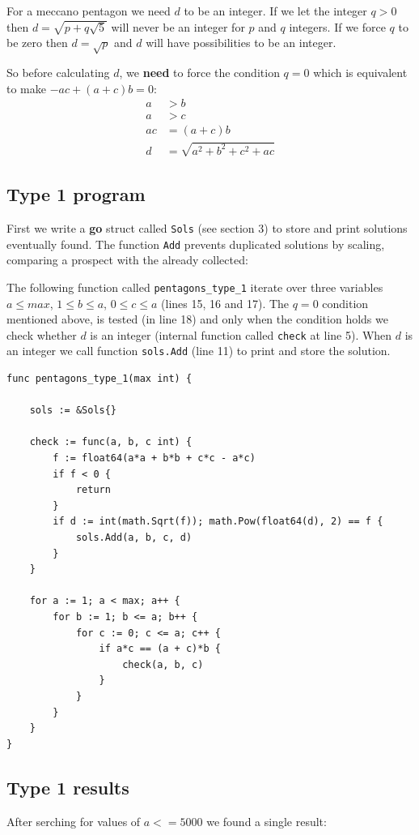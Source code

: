 \documentclass[11pt]{article}
\begin{document}
For a meccano pentagon we need $d$ to be an integer. If we let the integer $q > 0$ then $d = \sqrt{p + q\sqrt{5}}$ will never be an integer for $p$ and $q$ integers. If we force $q$ to be zero then $d = \sqrt{p}$ and $d$ will have possibilities to be an integer.

So before calculating $d$, we \textbf{need} to force the condition $q = 0$ which is 
equivalent to make $-ac + (a+c)b = 0$:
\begin{align*}
a  & > b\\
a  & > c\\
ac &= (a + c)b\\
 d &= \sqrt{a^2 + b^2 + c^2 + ac}
\end{align*}

\subsection{Type 1 program}

First we write a \textbf{go} struct called \texttt{Sols} (see section 3) to store and print solutions 
eventually found. The function \texttt{Add} prevents duplicated solutions by scaling,
comparing a prospect with the already collected:

The following function called \texttt{pentagons\_type\_1} iterate over three variables 
$a \leq max$, $1 \leq b \leq a$, $0 \leq c \leq a$ (lines 15, 16 and 17).
The $q = 0$ condition mentioned above, is tested (in line 18) and only when the condition holds
we check whether $d$ is an integer (internal function called \texttt{check} at line 5).
When $d$ is an integer we call function \texttt{sols.Add} (line 11) to print and store the 
solution.
\begin{lstlisting}
func pentagons_type_1(max int) {

	sols := &Sols{}

	check := func(a, b, c int) {
		f := float64(a*a + b*b + c*c - a*c)
		if f < 0 {
			return
		}
		if d := int(math.Sqrt(f)); math.Pow(float64(d), 2) == f {
			sols.Add(a, b, c, d)
		}
	}

	for a := 1; a < max; a++ {
		for b := 1; b <= a; b++ {
			for c := 0; c <= a; c++ {
				if a*c == (a + c)*b {
					check(a, b, c)
				}
			}
		}
	}
}
\end{lstlisting}

\subsection{Type 1 results}
After serching for values of $a <= 5000$ we found a single result:
\end{document}
